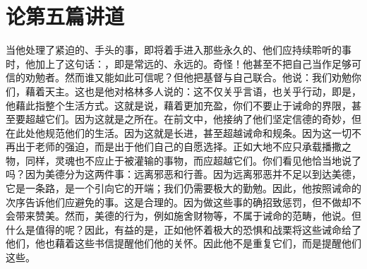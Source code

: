 

\section{论第五篇讲道}

\par

\par

当他处理了紧迫的、手头的事，即将着手进入那些永久的、他们应持续聆听的事时，他加上了这句话：，即是常远的、永远的。奇怪！他甚至不把自己当作足够可信的劝勉者。然而谁又能如此可信呢？但他把基督与自己联合。他说：我们劝勉你们，藉着天主。这也是他对格林多人说的：这不仅关乎言语，也关乎行动，即是，他藉此指整个生活方式。这就是说，藉着更加充盈，你们不要止于诫命的界限，甚至要超越它们。因为这就是之所在。在前文中，他接纳了他们坚定信德的奇妙，但在此处他规范他们的生活。因为这就是长进，甚至超越诫命和规条。因为这一切不再出于老师的强迫，而是出于他们自己的自愿选择。正如大地不应只承载播撒之物，同样，灵魂也不应止于被灌输的事物，而应超越它们。你们看见他恰当地说了吗？因为美德分为这两件事：远离邪恶和行善。因为远离邪恶并不足以到达美德，它是一条路，是一个引向它的开端；我们仍需要极大的勤勉。因此，他按照诫命的次序告诉他们应避免的事。这是合理的。因为做这些事的确招致惩罚，但不做却不会带来赞美。然而，美德的行为，例如施舍财物等，不属于诫命的范畴，他说。但什么是值得的呢？因此，有益的是，正如他怀着极大的恐惧和战栗将这些诫命给了他们，他也藉着这些书信提醒他们他的关怀。因此他不是重复它们，而是提醒他们这些。\par

